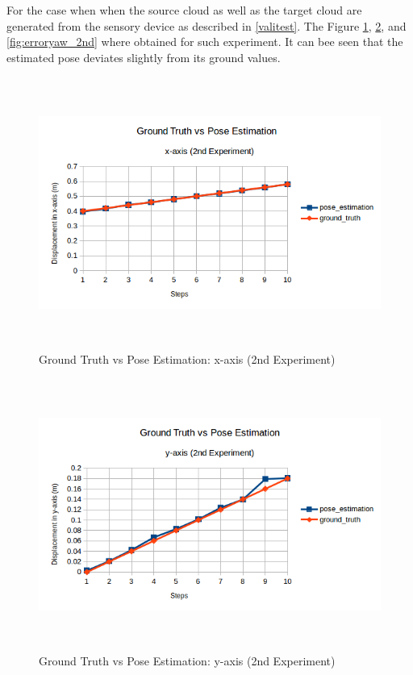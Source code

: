 For the case when when the source cloud as well as the target cloud are generated from the sensory device as described in \ref{valitest}. The Figure \ref{fig:errorx_2nd}, \ref{fig:errory_2nd}, and \ref{fig:erroryaw_2nd} where obtained for such experiment. It can bee seen that the estimated pose deviates slightly from its ground values.
\begin{figure}[!h]
\begin{center}
\includegraphics[width=5in, height=3.5in]{figures05/2_x_validation.png}
\caption{Ground Truth vs Pose Estimation: x-axis (2nd Experiment)}
\label{fig:errorx_2nd}
\end{center}
\end{figure}
\begin{figure}[!h]
\begin{center}
\includegraphics[width=5in, height=3.5in]{figures05/2_y_validation.png}
\caption{Ground Truth vs Pose Estimation: y-axis (2nd Experiment)}
\label{fig:errory_2nd}
\end{center}
\end{figure}
